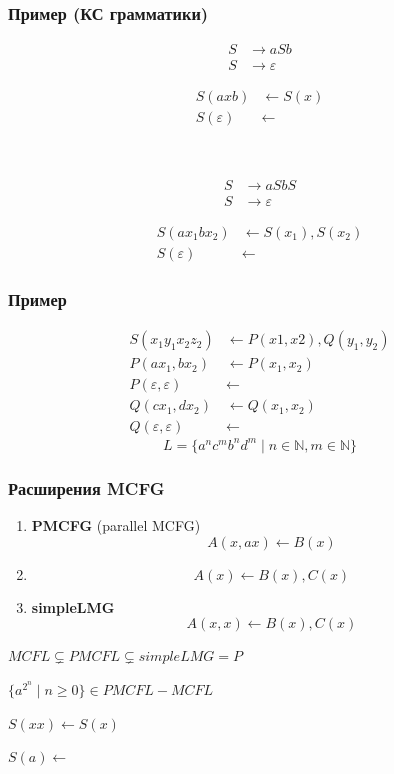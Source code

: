 \documentclass{beamer}
\begin{document}
\begin{frame}[fragile]
  \frametitle{Пример (КС грамматики)}
\begin{minipage}[t]{0.48\textwidth}
\begin{align*}
S &\to a S b \\
S &\to \varepsilon
\end{align*} 

\begin{align*}
S(axb) & \leftarrow S(x) \\
S(\varepsilon) & \leftarrow 
\end{align*} 
\end{minipage}
~\pause
\begin{minipage}[t]{0.48\textwidth}
\begin{align*}
S &\to a S b S\\
S &\to \varepsilon
\end{align*} 

\begin{align*}
S(ax_1bx_2) & \leftarrow S(x_1), S(x_2) \\
S(\varepsilon) & \leftarrow 
\end{align*} 
\end{minipage}

\end{frame}


\begin{frame}[fragile]
  
  \frametitle{Пример}

\begin{align*}
S(x_1 y_1 x_2 z_2) & \leftarrow P(x1,x2),Q(y_1,y_2) \\
P(ax_1, bx_2) & \leftarrow P(x_1,x_2) \\
P(\varepsilon,\varepsilon) &\leftarrow  \\
Q(cx_1, dx_2) & \leftarrow Q(x_1,x_2) \\
Q(\varepsilon,\varepsilon) &\leftarrow  
\end{align*} 
\pause
$$
L = \{a^nc^mb^nd^m \mid n \in \mathbb{N}, m \in \mathbb{N} \}
$$
\end{frame}

\begin{frame}[fragile]
  
  \frametitle{Расширения MCFG}
  \begin{enumerate}
    \item \textbf{PMCFG} (parallel MCFG) 
    $$
    A(x, ax) \leftarrow B(x)
    $$

    \item 
    $$
    A(x) \leftarrow B(x),C(x)
    $$
    \item \textbf{simpleLMG} 
    $$
    A(x, x) \leftarrow B(x),C(x)
    $$
  \end{enumerate}
  \pause
  $MCFL \varsubsetneq PMCFL \varsubsetneq simpleLMG = P$

  $\{a^{2^n} \mid n\geq 0\} \in PMCFL - MCFL $

  $S(xx) \leftarrow S(x)$  

  $S(a) \leftarrow $
\end{frame}
\end{document}

